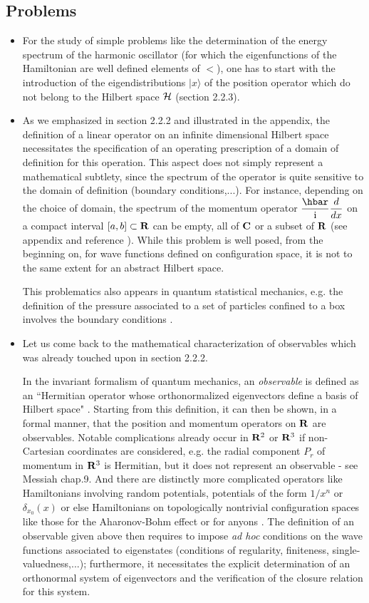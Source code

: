 \documentclass[12pt]{report}
\def\underline{\relax}
\begin{document}
\subsection{Problems}
 
\begin{itemize}
\item
For the study of simple problems like the determination of 
the energy spectrum of the harmonic oscillator 
(for which the eigenfunctions of the Hamiltonian are 
well defined elements of $\lt$),
one has to start with the introduction of the 
eigendistributions $|x \rangle$ of the position operator 
which do not belong to the Hilbert space 
${\cal H}$ (section 2.2.3).
\item
As we emphasized in section 2.2.2 and illustrated in the appendix, 
the definition of a linear operator on an infinite dimensional 
Hilbert space necessitates the specification of an 
operating prescription \underline{and} of a domain of definition 
for this operation. 
This aspect does not simply represent a mathematical subtlety, 
since the spectrum of the operator is quite sensitive to the 
domain of definition (boundary conditions,...). 
For instance, depending on the choice of domain,
the spectrum of the momentum operator 
$\ds{\hbar \over \ri} \ds{d \over dx}$ on a compact interval
$[a,b] \subset {\bf R}$ can be 
empty, all of ${\bf C}$ or a subset of 
 ${\bf R}$ (see appendix  and reference \cite{sg}).
While this problem is well posed,  from the beginning on, for wave
functions defined on configuration space, it is not 
to the same extent for an abstract Hilbert space. 


This problematics also appears in quantum statistical mechanics, 
e.g. the definition of the pressure associated to a 
 set of particles confined to a box involves the 
boundary conditions \cite{rob}.
\item 
Let us come back to the mathematical characterization 
of observables which was already touched upon in section 2.2.2. 

In the invariant formalism of quantum mechanics, an 
{\em observable} is defined as an ``Hermitian operator 
whose orthonormalized eigenvectors define a basis of Hilbert 
space" \cite{ct}. 
Starting from this definition, it can then be shown, in a formal 
manner, that the position and momentum operators on ${\bf R}$ are 
observables. 
Notable complications already occur in ${\bf R}^2$ or ${\bf R}^3$
if non-Cartesian coordinates 
are considered, 
e.g. the radial component 
$P_r$ of momentum in ${\bf R}^3$ is Hermitian, but it does not represent 
an observable - see Messiah \cite{ct} chap.9. 
And there are distinctly more complicated operators 
like Hamiltonians involving random potentials, potentials
of the form $1/  x^n$ or $\delta_{x_0} (x)$
or else Hamiltonians on topologically nontrivial configuration 
spaces like those for the Aharonov-Bohm effect or for anyons
\cite{rs, bs, ber}.
The definition of an observable given above then requires 
to impose {\em ad hoc} conditions on the wave functions 
associated to eigenstates (conditions of regularity, finiteness,
single-valuedness,...); furthermore, it necessitates the
explicit determination  of an orthonormal system of eigenvectors and the
verification  of the closure relation for this system. 


\end{itemize}
\end{document}
